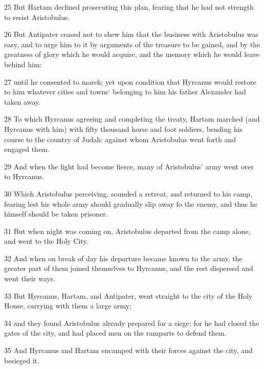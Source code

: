 \par 25 But Hartam declined prosecuting this plan, fearing that he had not strength to resist Aristobulus. 

\par 26 But Antipater ceased not to shew him that the business with Aristobulus was easy, and to urge him to it by arguments of the treasure to be gained, and by the greatness of glory which he would acquire, and the memory which he would leave behind him: 

\par 27 until he consented to march; yet upon condition that Hyrcanus would restore to him whatever cities and towns‘ belonging to him his father Alexander had taken away. 

\par 28 To which Hyrcanus agreeing and completing the treaty, Hartam marched (and Hyrcanus with him) with fifty thousand horse and foot soldiers, bending his course to the country of Judah: against whom Aristobulus went forth and engaged them. 

\par 29 And when the fight had become fierce, many of Aristobulus’ army went over to Hyrcanus. 

\par 30 Which Aristobulus perceiving, sounded a retreat, and returned to his camp, fearing lest his whole army should gradually slip away fo the enemy, and thus he himself should be taken prisoner. 

\par 31 But when night was coming on, Aristobulus departed from the camp alone, and went to the Holy City. 

\par 32 And when on break of day his departure became known to the army, the greater part of them joined themselves to Hyrcanus, and the rest dispersed and went their ways. 

\par 33 But Hyrcanus, Hartam, and Antipater, went straight to the city of the Holy House, carrying with them a large army; 

\par 34 and they found Aristobulus already prepared for a siege; for he had closed the gates of the city, and had placed men on the ramparts to defend them. 

\par 35 And Hyrcanus and Hartam encamped with their forces against the city, and besieged it. 


